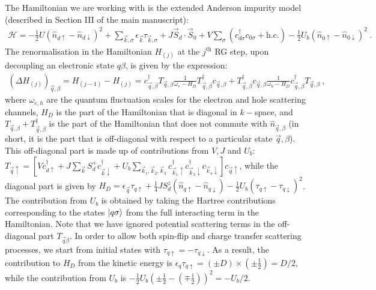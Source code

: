 The Hamiltonian we are working with is the extended Anderson impurity model (described in Section III of the main manuscript):
\begin{eqnarray}
	\mathcal{H} = -\frac{1}{2}U \left(\hat n_{d \uparrow} - \hat n_{d \downarrow}\right)^2 + \sum_{\vec k,\sigma} \epsilon_{\vec k} \tau_{\vec k,\sigma} + J \vec{S}_d\cdot\vec{S}_0 + V\sum_\sigma \left( c^\dagger_{d\sigma}c_{0\sigma} + \text{h.c.}\right) - \frac{1}{2}U_b \left(\hat n_{0 \uparrow} - \hat n_{0 \downarrow}\right)^2~.\quad
\end{eqnarray}
The renormalisation in the Hamiltonian \(H_{(j)}\) at the \(j^\text{th}\) RG step, upon decoupling an electronic state \(q\beta\), is given by the expression:
\begin{eqnarray}
	\left(\Delta H_{(j)}\right)_{\vec q,\beta} = H_{(j-1)} - H_{(j)} = c^\dagger_{\vec q,\beta} T_{\vec q,\beta} \frac{1}{\omega_e - H_D} T^\dagger_{\vec q,\beta}c_{\vec q,\beta} + T^\dagger_{\vec q,\beta} c_{\vec q,\beta} \frac{1}{\omega_h - H_D} c^\dagger_{\vec q,\beta}T_{\vec q,\beta}~,
\end{eqnarray}
where \(\omega_{e,h}\) are the quantum fluctuation scales for the electron and hole scattering channels, \(H_D\) is the part of the Hamiltonian that is diagonal in \(k-\)space, and \(T_{\vec q,\beta} + T_{\vec q,\beta}^\dagger\) is the part of the Hamiltonian that does not commute with \(\hat n_{\vec q,\beta}\) (in short, it is the part that is off-diagonal with respect to a particular state \(\vec q,\beta\)). This off-diagonal part is made up of contributions from \(V,J\) and \(U_b\): \(T_{\vec q \uparrow} = \left[V c^\dagger_{d \uparrow}  + J \sum_{\vec k}S_d^+ c^\dagger_{\vec k \downarrow}  + U_b \sum_{\vec k_1,\vec k_2,\vec k_3}c^\dagger_{\vec k_1 \uparrow} c^\dagger_{\vec k_3 \downarrow} c_{\vec k_4 \downarrow}\right] c_{\vec q \uparrow}\),
while the diagonal part is given by \(H_D = \epsilon_{\vec q} \tau_{q\uparrow} + \frac{1}{4}J S_d^z\left(\hat n_{q \uparrow} - \hat n_{q \downarrow}\right) - \frac{1}{2}U_b \left(\tau_{q \uparrow} - \tau_{q \downarrow}\right)^2\). The contribution from \(U_b\) is obtained by taking the Hartree contributions corresponding to the states \(\ket{q\sigma}\) from the full interacting term in the Hamiltonian.
Note that we have ignored potential scattering terms in the off-diagonal part \(T_{\vec q\beta}\). In order to allow both spin-flip and charge transfer scattering processes, we start from initial states with \(\tau_{q \uparrow} = -\tau_{q \downarrow}\). As a result, the contribution to \(H_D\) from the kinetic energy is \(\epsilon_q \tau_{q \uparrow} = \left(\pm D\right)\times\left(\pm\frac{1}{2}\right) = D/2\), while the contribution from \(U_b\) is \(-\frac{1}{2}U_b\left(\pm\frac{1}{2} - \left( \mp\frac{1}{2} \right) \right)^2 = -U_b/2 \).

